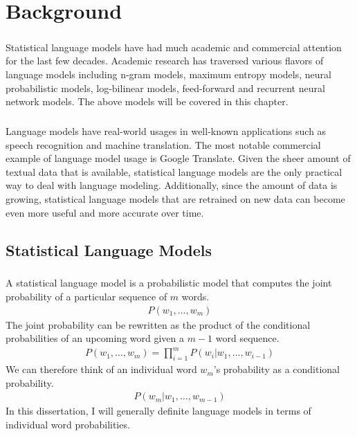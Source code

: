 \documentclass[12pt]{ociamthesis}
\begin{document}
\chapter{Background}
\paragraph{}
Statistical language models have had much academic and commercial attention for the last few decades. Academic research has traversed various flavors of language models including n-gram models, maximum entropy models, neural probabilistic models, log-bilinear models, feed-forward and recurrent neural network models. The above models will be covered in this chapter. 
\paragraph{}
Language models have real-world usages in well-known applications such as speech recognition and machine translation. The most notable commercial example of language model usage is Google Translate. Given the sheer amount of textual data that is available, statistical language models are the only practical way to deal with language modeling. Additionally, since the amount of data is growing,  statistical language models that are retrained on new data can become even more useful and more accurate over time.

\section{Statistical Language Models}
\paragraph{}
A statistical language model is a probabilistic model that computes the joint probability of a particular sequence of  $m$ words.  
\begin{align}
P(w_1, \dots ,w_m)
\end{align}
The joint probability can be rewritten as the product of the conditional probabilities of an upcoming word given a $m-1$ word sequence.
\begin{align}
P(w_1, \dots ,w_m) = \prod_{i=1}^m P(w_i | w_1,\dots, w_{i-1})
\end{align}
We can therefore think of an individual word $w_m$'s probability as a conditional probability.
\begin{align}
P(w_m | w_1,\dots, w_{m-1})
\end{align}
In this dissertation, I will generally definite language models in terms of individual word probabilities.
\end{document}
